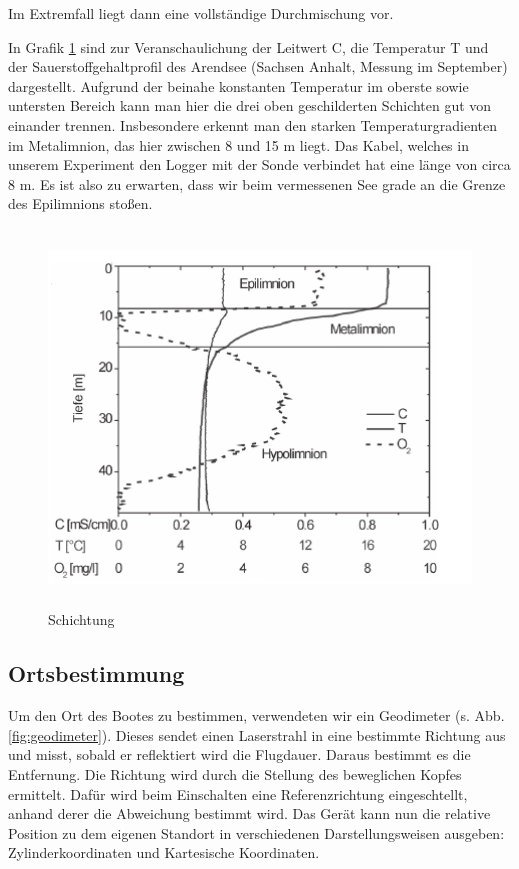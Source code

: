 \documentclass[12pt,a4paper,titlepage,headinclude,bibtotoc]{scrartcl}
\begin{document}
Im Extremfall liegt dann eine vollständige Durchmischung vor.


In Grafik \ref{fig:schichtung} sind zur Veranschaulichung der Leitwert C, die Temperatur T und der Sauerstoffgehaltprofil des Arendsee (Sachsen Anhalt, Messung im September) dargestellt. 
Aufgrund der beinahe konstanten Temperatur im oberste sowie untersten Bereich kann man hier die drei oben geschilderten Schichten gut von einander trennen. Insbesondere erkennt man den starken Temperaturgradienten im Metalimnion, das hier zwischen 8 und 15 m liegt. 
Das Kabel, welches in unserem Experiment den Logger mit der Sonde verbindet hat eine länge von circa 8 m. Es ist also zu erwarten, dass wir beim vermessenen See grade an die Grenze des Epilimnions stoßen.




\begin{figure}[h]
	\centering
	\includegraphics[height=10cm]{schicht.png}
	\caption{Schichtung}
	\label{fig:schichtung}
\end{figure}



\subsection{Ortsbestimmung}
Um den Ort des Bootes zu bestimmen, verwendeten wir ein Geodimeter (s. Abb. \ref{fig:geodimeter}).
Dieses sendet einen Laserstrahl in eine bestimmte Richtung aus und misst, sobald er reflektiert wird die Flugdauer.
Daraus bestimmt es die Entfernung.
Die Richtung wird durch die Stellung des beweglichen Kopfes ermittelt.
Dafür wird beim Einschalten eine Referenzrichtung eingeschtellt, anhand derer die Abweichung bestimmt wird.
Das Gerät kann nun die relative Position zu dem eigenen Standort in verschiedenen Darstellungsweisen ausgeben: Zylinderkoordinaten und Kartesische Koordinaten.
\end{document}
